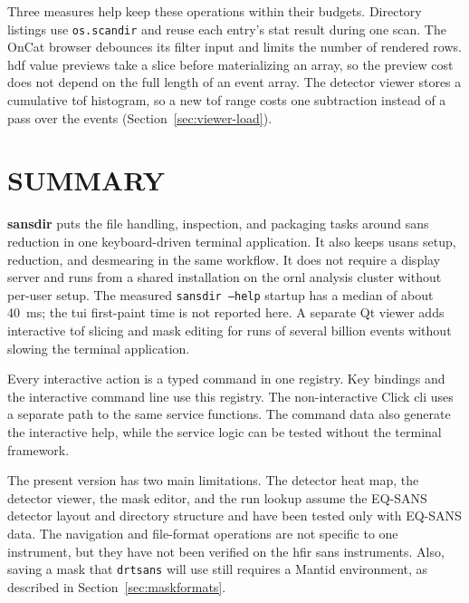 \documentclass[tm]{ornltm}
\begin{document}
Three measures help keep these operations within their budgets. Directory
listings use \texttt{os.scandir} and reuse each entry's stat result during one
scan. The OnCat browser debounces its filter input and limits the number of
rendered rows. \Ac{hdf} value previews take a slice before materializing an
array, so the preview cost does not depend on the full length of an event array.
The detector viewer stores a cumulative \ac{tof} histogram, so a new \ac{tof}
range costs one subtraction instead of a pass over the events
(Section~\ref{sec:viewer-load}).

\section{SUMMARY}
\label{sec:future}

\textbf{sansdir} puts the file handling, inspection, and packaging tasks around
\ac{sans} reduction in one keyboard-driven terminal application. It also keeps
\ac{usans} setup, reduction, and desmearing in the same workflow. It does not
require a display server and runs from a shared installation on the \ac{ornl}
analysis cluster without per-user setup. The measured
\texttt{sansdir --help} startup has a median of about 40~ms; the \ac{tui}
first-paint time is not reported here. A separate Qt viewer adds interactive
\ac{tof} slicing and mask editing for runs of several billion events without
slowing the terminal application.

Every interactive action is a typed command in one registry. Key bindings and
the interactive command line use this registry. The non-interactive Click
\ac{cli} uses a separate path to the same service functions. The command data
also generate the interactive help, while the service logic can be tested
without the terminal framework.

The present version has two main limitations. The detector heat map, the
detector viewer, the mask editor, and the run lookup assume the EQ-SANS detector
layout and directory structure and have been tested only with EQ-SANS data. The navigation and file-format operations are not specific to one
instrument, but they have not been verified on the \ac{hfir} \ac{sans}
instruments. Also, saving a mask that \texttt{drtsans} will use still requires a
Mantid environment, as described in Section~\ref{sec:maskformats}.
\end{document}
